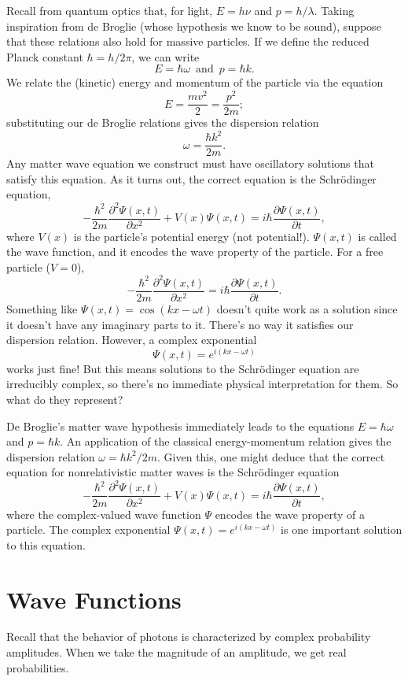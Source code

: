 \documentclass[../p052main.tex]{subfiles}
\begin{document}
Recall from quantum optics that, for light, $E = h\nu$ and $p = h / \lambda$.
Taking inspiration from de Broglie (whose hypothesis we know to be sound), suppose that these relations also hold for massive particles.
If we define the reduced Planck constant $\hbar = h / 2\pi$, we can write
\[ E = \hbar \omega \,\text{ and }\, p = \hbar k. \]
We relate the (kinetic) energy and momentum of the particle via the equation
\[ E = \frac{mv^2}{2} = \frac{p^2}{2m}; \]
substituting our de Broglie relations gives the dispersion relation
\[ \omega = \frac{\hbar k^2}{2m}. \]
Any matter wave equation we construct must have oscillatory solutions that satisfy this equation.
As it turns out, the correct equation is the Schrödinger equation,
\[ -\frac{\hbar^2}{2m} \frac{\partial^2 \Psi(x,t)}{\partial x^2} + V(x) \Psi(x,t) = i \hbar \frac{\partial \Psi(x,t)}{\partial t}, \]
where $V(x)$ is the particle's potential energy (not potential!).
$\Psi(x,t)$ is called the wave function, and it encodes the wave property of the particle.
For a free particle ($V = 0$),
\[ -\frac{\hbar^2}{2m} \frac{\partial^2 \Psi(x,t)}{\partial x^2} = i \hbar \frac{\partial \Psi(x,t)}{\partial t}. \]
Something like $\Psi(x,t) = \cos (kx - \omega t)$ doesn't quite work as a solution since it doesn't have any imaginary parts to it.
There's no way it satisfies our dispersion relation.
However, a complex exponential
\[ \Psi(x,t) = e^{i(kx - \omega t)} \]
works just fine!
But this means solutions to the Schrödinger equation are irreducibly complex, so there's no immediate physical interpretation for them.
So what do they represent?

\begin{summary}
    De Broglie's matter wave hypothesis immediately leads to the equations $E = \hbar \omega$ and $p = \hbar k$.
    An application of the classical energy-momentum relation gives the dispersion relation $\omega = \hbar k^2 / 2m$.
    Given this, one might deduce that the correct equation for nonrelativistic matter waves is the Schrödinger equation
    \[ -\frac{\hbar^2}{2m} \frac{\partial^2 \Psi(x,t)}{\partial x^2} + V(x) \Psi(x,t) = i \hbar \frac{\partial \Psi(x,t)}{\partial t}, \]
    where the complex-valued wave function $\Psi$ encodes the wave property of a particle.
    The complex exponential $\Psi(x,t) = e^{i(kx - \omega t)}$ is one important solution to this equation.
\end{summary}

\section{Wave Functions}
Recall that the behavior of photons is characterized by complex probability amplitudes.
When we take the magnitude of an amplitude, we get real probabilities.
\end{document}
